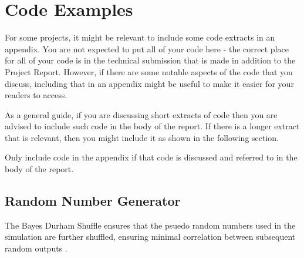 \chapter{Code Examples}

For some projects, it might be relevant to include some code extracts in an appendix. You are not expected to put all of your code here - the correct place for all of your code is in the technical submission that is made in addition to the Project Report. However, if there are some notable aspects of the code that you discuss, including that in an appendix might be useful to make it easier for your readers to access. 

As a general guide, if you are discussing short extracts of code then you are advised to include such code in the body of the report. If there is a longer extract that is relevant, then you might include it as shown in the following section. 

Only include code in the appendix if that code is discussed and referred to in the body of the report. 

\section{Random Number Generator}

The Bayes Durham Shuffle ensures that the psuedo random numbers used in the simulation are further shuffled, ensuring minimal correlation between subsequent random outputs \cite{NumericalRecipes}.

